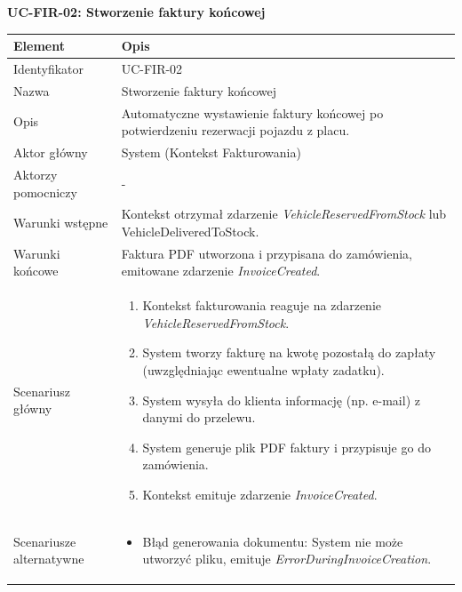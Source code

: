 \textbf{UC-FIR-02: Stworzenie faktury końcowej}

\begin{longtable}{|p{4cm}|p{11cm}|}
\hline
\textbf{Element} & \textbf{Opis} \\
\hline

Identyfikator & UC-FIR-02 \\
\hline

Nazwa & Stworzenie faktury końcowej \\
\hline

Opis & 
Automatyczne wystawienie faktury końcowej po potwierdzeniu rezerwacji pojazdu z placu. \\
\hline

Aktor główny & System (Kontekst Fakturowania) \\
\hline

Aktorzy pomocniczy & - \\
\hline

Warunki wstępne & 
Kontekst otrzymał zdarzenie \textit{VehicleReservedFromStock} lub {VehicleDeliveredToStock}. \\
\hline

Warunki końcowe & 
Faktura PDF utworzona i przypisana do zamówienia, emitowane zdarzenie \textit{InvoiceCreated}. \\
\hline

Scenariusz główny & 
\begin{enumerate}
    \item Kontekst fakturowania reaguje na zdarzenie \textit{VehicleReservedFromStock}.
    \item System tworzy fakturę na kwotę pozostałą do zapłaty (uwzględniając ewentualne wpłaty zadatku).
    \item System wysyła do klienta informację (np. e-mail) z danymi do przelewu.
    \item System generuje plik PDF faktury i przypisuje go do zamówienia.
    \item Kontekst emituje zdarzenie \textit{InvoiceCreated}.
\end{enumerate} \\
\hline

Scenariusze alternatywne & 
\begin{itemize}
    \item [A1] Błąd generowania dokumentu: System nie może utworzyć pliku, emituje \textit{ErrorDuringInvoiceCreation}.
\end{itemize} \\
\hline
\end{longtable}

